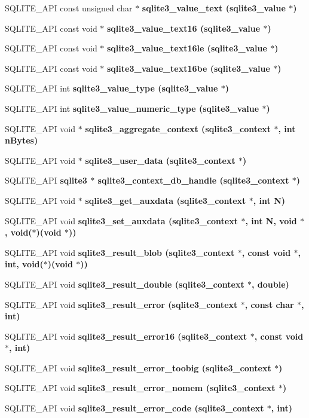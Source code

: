 \begin{CompactItemize}
\item 
SQLITE\_\-API const unsigned char $\ast$ \bf{sqlite3\_\-value\_\-text} (\bf{sqlite3\_\-value} $\ast$)
\item 
SQLITE\_\-API const void $\ast$ \bf{sqlite3\_\-value\_\-text16} (\bf{sqlite3\_\-value} $\ast$)
\item 
SQLITE\_\-API const void $\ast$ \bf{sqlite3\_\-value\_\-text16le} (\bf{sqlite3\_\-value} $\ast$)
\item 
SQLITE\_\-API const void $\ast$ \bf{sqlite3\_\-value\_\-text16be} (\bf{sqlite3\_\-value} $\ast$)
\item 
SQLITE\_\-API int \bf{sqlite3\_\-value\_\-type} (\bf{sqlite3\_\-value} $\ast$)
\item 
SQLITE\_\-API int \bf{sqlite3\_\-value\_\-numeric\_\-type} (\bf{sqlite3\_\-value} $\ast$)
\item 
SQLITE\_\-API void $\ast$ \bf{sqlite3\_\-aggregate\_\-context} (\bf{sqlite3\_\-context} $\ast$, int n\-Bytes)
\item 
SQLITE\_\-API void $\ast$ \bf{sqlite3\_\-user\_\-data} (\bf{sqlite3\_\-context} $\ast$)
\item 
SQLITE\_\-API \bf{sqlite3} $\ast$ \bf{sqlite3\_\-context\_\-db\_\-handle} (\bf{sqlite3\_\-context} $\ast$)
\item 
SQLITE\_\-API void $\ast$ \bf{sqlite3\_\-get\_\-auxdata} (\bf{sqlite3\_\-context} $\ast$, int N)
\item 
SQLITE\_\-API void \bf{sqlite3\_\-set\_\-auxdata} (\bf{sqlite3\_\-context} $\ast$, int N, void $\ast$, void($\ast$)(void $\ast$))
\item 
SQLITE\_\-API void \bf{sqlite3\_\-result\_\-blob} (\bf{sqlite3\_\-context} $\ast$, const void $\ast$, int, void($\ast$)(void $\ast$))
\item 
SQLITE\_\-API void \bf{sqlite3\_\-result\_\-double} (\bf{sqlite3\_\-context} $\ast$, double)
\item 
SQLITE\_\-API void \bf{sqlite3\_\-result\_\-error} (\bf{sqlite3\_\-context} $\ast$, const char $\ast$, int)
\item 
SQLITE\_\-API void \bf{sqlite3\_\-result\_\-error16} (\bf{sqlite3\_\-context} $\ast$, const void $\ast$, int)
\item 
SQLITE\_\-API void \bf{sqlite3\_\-result\_\-error\_\-toobig} (\bf{sqlite3\_\-context} $\ast$)
\item 
SQLITE\_\-API void \bf{sqlite3\_\-result\_\-error\_\-nomem} (\bf{sqlite3\_\-context} $\ast$)
\item 
SQLITE\_\-API void \bf{sqlite3\_\-result\_\-error\_\-code} (\bf{sqlite3\_\-context} $\ast$, int)

\end{CompactItemize}

